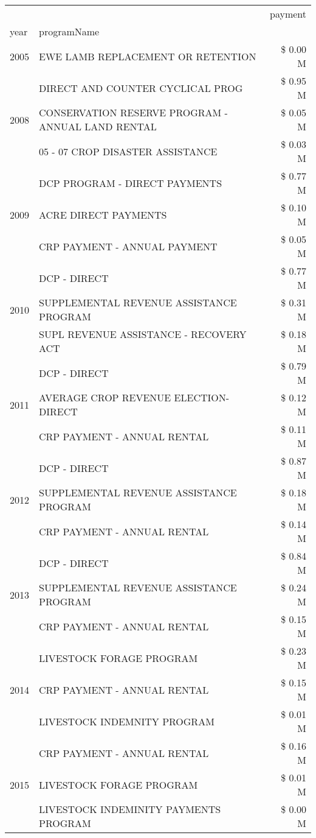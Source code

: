 \begin{tabular}{llr}
\toprule
 &  & payment \\
year & programName &  \\
\midrule
2005 & EWE LAMB REPLACEMENT OR RETENTION & \$ 0.00 M \\
\cline{1-3}
\multirow[t]{3}{*}{2008} & DIRECT AND COUNTER CYCLICAL PROG & \$ 0.95 M \\
 & CONSERVATION RESERVE PROGRAM - ANNUAL LAND RENTAL & \$ 0.05 M \\
 & 05 - 07 CROP DISASTER ASSISTANCE & \$ 0.03 M \\
\cline{1-3}
\multirow[t]{3}{*}{2009} & DCP PROGRAM - DIRECT PAYMENTS & \$ 0.77 M \\
 & ACRE DIRECT PAYMENTS & \$ 0.10 M \\
 & CRP PAYMENT - ANNUAL PAYMENT & \$ 0.05 M \\
\cline{1-3}
\multirow[t]{3}{*}{2010} & DCP - DIRECT & \$ 0.77 M \\
 & SUPPLEMENTAL REVENUE ASSISTANCE PROGRAM & \$ 0.31 M \\
 & SUPL REVENUE ASSISTANCE - RECOVERY ACT & \$ 0.18 M \\
\cline{1-3}
\multirow[t]{3}{*}{2011} & DCP - DIRECT & \$ 0.79 M \\
 & AVERAGE CROP REVENUE ELECTION-DIRECT & \$ 0.12 M \\
 & CRP PAYMENT - ANNUAL RENTAL & \$ 0.11 M \\
\cline{1-3}
\multirow[t]{3}{*}{2012} & DCP - DIRECT & \$ 0.87 M \\
 & SUPPLEMENTAL REVENUE ASSISTANCE PROGRAM & \$ 0.18 M \\
 & CRP PAYMENT - ANNUAL RENTAL & \$ 0.14 M \\
\cline{1-3}
\multirow[t]{3}{*}{2013} & DCP - DIRECT & \$ 0.84 M \\
 & SUPPLEMENTAL REVENUE ASSISTANCE PROGRAM & \$ 0.24 M \\
 & CRP PAYMENT - ANNUAL RENTAL & \$ 0.15 M \\
\cline{1-3}
\multirow[t]{3}{*}{2014} & LIVESTOCK FORAGE PROGRAM & \$ 0.23 M \\
 & CRP PAYMENT - ANNUAL RENTAL & \$ 0.15 M \\
 & LIVESTOCK INDEMNITY PROGRAM & \$ 0.01 M \\
\cline{1-3}
\multirow[t]{3}{*}{2015} & CRP PAYMENT - ANNUAL RENTAL & \$ 0.16 M \\
 & LIVESTOCK FORAGE PROGRAM & \$ 0.01 M \\
 & LIVESTOCK INDEMINITY PAYMENTS PROGRAM & \$ 0.00 M \\

\end{tabular}
